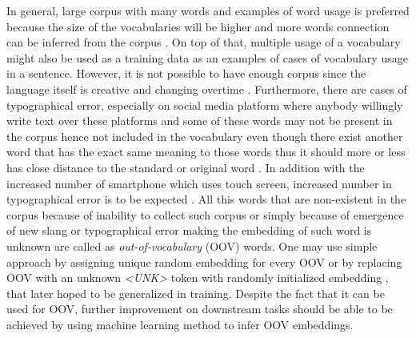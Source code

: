     In general, large corpus with many words and examples of word
    usage is preferred because the size of the vocabularies will be
    higher and more words connection can be inferred from the corpus
    \citep{size2018kutuzov}. On top of that, multiple usage of a
    vocabulary might also be used as a training data as an examples of
    cases of vocabulary usage in a sentence. However, it is not
    possible to have enough corpus since the language itself is
    creative and changing overtime \citep{forrester2008abrief,
    speech2009Jurafsky:2009:SLP:1214993}. Furthermore, there are cases
    of typographical error, especially on social media platform where
    anybody willingly write text over these platforms
    \citep{Liu2010SentimentAA} and some of these words may not be
    present in the corpus hence not included in the vocabulary even
    though there exist another word that has the exact same meaning to
    those words thus it should more or less has close distance to the
    standard or original word \citep{mapping2012eisenstein}. In
    addition with the increased number of smartphone which uses touch
    screen, increased number in typographical error is to be expected
    \citep{ghosh2017correction}. All this words that are non-existent
    in the corpus because of inability to collect such corpus or
    simply because of emergence of new slang or typographical error
    making the embedding of such word is unknown are called as
    \textit{out-of-vocabulary} (OOV) words. One may use simple
    approach by assigning unique random embedding for every OOV or by
    replacing OOV with an unknown \textit{\textless UNK\textgreater}
    token with randomly initialized embedding
    \citep{predicting2019garneau}, that later hoped to be generalized
    in training. Despite the fact that it can be used for OOV, further
    improvement on downstream tasks should be able to be achieved by
    using machine learning method to infer OOV embeddings.


